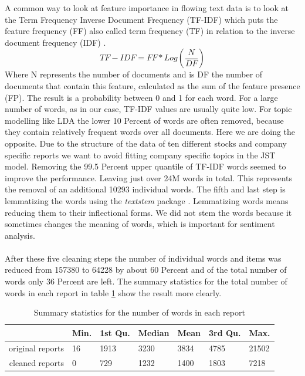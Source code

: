 A common way to look at feature importance in flowing text data is to look at the Term Frequency Inverse Document Frequency (TF-IDF) which puts the feature frequency (FF) also called term frequency (TF) in relation to the inverse document frequency (IDF) \citep{na2004effectiveness}. 
\begin{equation}
    TF-IDF = FF * Log(\frac{N}{DF})
\end{equation} 
Where N represents the number of documents and is DF the number of documents that contain this feature, calculated as the sum of the feature presence (FP). The result is a probability between 0 and 1 for each word. For a large number of words, as in our case, TF-IDF values are usually quite low. For topic modelling like LDA the lower 10 Percent of words are often removed, because they contain relatively frequent words over all documents. Here we are doing the opposite. Due to the structure of the data of ten different stocks and company specific reports we want to avoid fitting company specific topics in the JST model. Removing the 99.5 Percent upper quantile of TF-IDF words seemed to improve the performance. Leaving just over 24M words in total. This represents the removal of an additional 10293 individual words. The fifth and last step is lemmatizing the words using the \textit{textstem} package \citep{textstem}. Lemmatizing words means reducing them to their inflectional forms. We did not stem the words because it sometimes changes the meaning of words, which is important for sentiment analysis. \\ \\

After these five cleaning steps the number of individual words and items was reduced from 157380 to 64228 by about 60 Percent and of the total number of words only 36 Percent are left. The summary statistics for the total number of words in each report in table \ref{tab:summaryCR} show the result more clearly. 
\begin{table}[ht]
\centering
\begin{tabular}{rllllll}
  \hline
  & Min. & 1st Qu. & Median  &  Mean & 3rd Qu. &   Max. \\
  \hline
  original reports & 16  &  1913  &  3230 &   3834  &  4785  & 21502  \\ 
  cleaned reports  & 0   &  729  &  1232  &  1400  &  1803  &  7218  \\ 
   \hline
\end{tabular}\label{tab:summaryCR}
\caption{Summary statistics for the number of words in each report}
\end{table}

